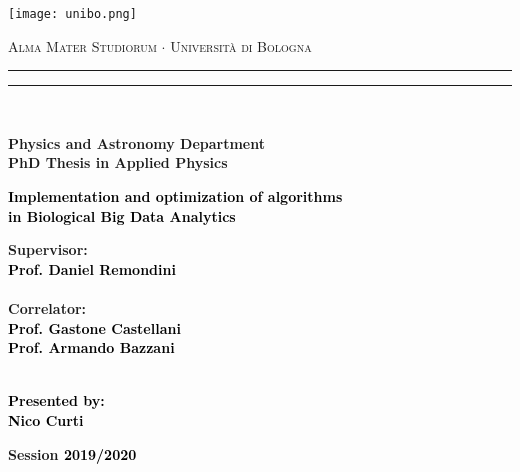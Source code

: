 \documentclass{standalone}
\begin{document}
\begin{titlepage}

\centering
\texttt{[image: unibo.png]}

\begin{center}
{{\Large{\textsc{Alma Mater Studiorum $\cdot$ Universit\`a di Bologna}}}}
\rule[0.1cm]{15.8cm}{0.1mm}
\rule[0.5cm]{15.8cm}{0.6mm}
\\\vspace{3mm}

{\small{\bf Physics and Astronomy Department\\PhD Thesis in Applied Physics}}

\end{center}

\vspace{23mm}

\begin{center}\textcolor{black}{
{\Large{\bf Implementation and optimization of algorithms\\in Biological Big Data Analytics}}\\
}\end{center}

\vspace{40mm} \par \noindent

\begin{minipage}[t]{\textwidth}
{\large{\bf Supervisor: \vspace{2mm}\\\textcolor{black}{
Prof. Daniel Remondini }}}\\\\
{\large{\bf Correlator: \vspace{2mm}\\\textcolor{black}{
Prof. Gastone Castellani\\
Prof. Armando Bazzani }}}\\\\
\end{minipage}


\hfill

\begin{minipage}[t]{\textwidth}\raggedleft \textcolor{black}{
{\large{\bf Presented by:
\vspace{2mm}\\
Nico Curti}}}
\end{minipage}

\vspace{17mm}

\begin{center}
{\large{\bf Session \textcolor{black}{2019/2020}
}}
\end{center}

\end{titlepage}
\end{document}
